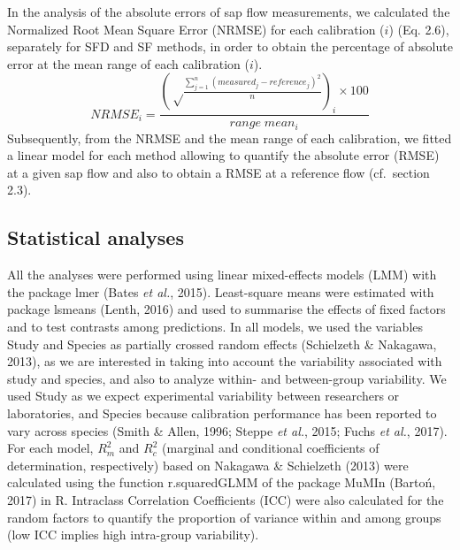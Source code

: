 \documentclass[11pt,twoside]{reedthesis}
\begin{document}
In the analysis of the absolute errors of sap flow measurements, we
calculated the Normalized Root Mean Square Error (NRMSE) for each
calibration (\(i\)) (Eq. 2.6), separately for SFD and SF methods, in
order to obtain the percentage of absolute error at the mean range of
each calibration (\(i\)).
\begin{equation}
NRMSE_i = \frac{(\sqrt \frac{\sum_{j=1}^{n} (measured_j-reference_j)^2}{n})_i\times 100}{range\;mean_i}
\end{equation}
Subsequently, from the NRMSE and the mean range of each calibration, we
fitted a linear model for each method allowing to quantify the absolute
error (RMSE) at a given sap flow and also to obtain a RMSE at a
reference flow (cf.~section 2.3).\par

\subsection{Statistical analyses}\label{statistical-analyses}

All the analyses were performed using linear mixed-effects models (LMM)
with the package lmer (Bates \emph{et al.}, 2015). Least-square means
were estimated with package lsmeans (Lenth, 2016) and used to summarise
the effects of fixed factors and to test contrasts among predictions. In
all models, we used the variables Study and Species as partially crossed
random effects (Schielzeth \& Nakagawa, 2013), as we are interested in
taking into account the variability associated with study and species,
and also to analyze within- and between-group variability. We used Study
as we expect experimental variability between researchers or
laboratories, and Species because calibration performance has been
reported to vary across species (Smith \& Allen, 1996; Steppe \emph{et
al.}, 2015; Fuchs \emph{et al.}, 2017). For each model, \(R^2_m\) and
\(R^2_c\) (marginal and conditional coefficients of determination,
respectively) based on Nakagawa \& Schielzeth (2013) were calculated
using the function r.squaredGLMM of the package MuMIn (Bartoń, 2017) in
R. Intraclass Correlation Coefficients (ICC) were also calculated for
the random factors to quantify the proportion of variance within and
among groups (low ICC implies high intra-group variability).\par
\end{document}
